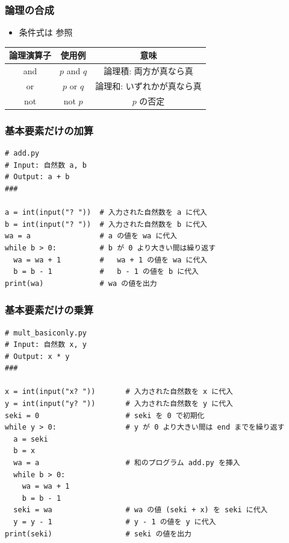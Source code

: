 \begin{frame}[fragile]
\frametitle{論理の合成}
  \begin{itemize}
\item 条件式は \href{https://docs.python.org/ja/3/reference/index.html}{}参照
  \end{itemize}
  \begin{center}
    \begin{tabular}{c|c|c}
論理演算子&使用例&意味\\\hline
and & $p$ and $q$ & 論理積: 両方が真なら真\\
or & $p$ or $q$ & 論理和: いずれかが真なら真\\
not & not $p$ & $p$ の否定\\
    \end{tabular}
  \end{center}
\end{frame}
\begin{frame}
\frametitle{基本要素だけの加算}
  \begin{lstlisting}[caption={add.py},label=add]
# add.py
# Input: 自然数 a, b
# Output: a + b
###

a = int(input("? "))  # 入力された自然数を a に代入
b = int(input("? "))  # 入力された自然数を b に代入
wa = a                # a の値を wa に代入
while b > 0:          # b が 0 より大きい間は繰り返す
  wa = wa + 1         #   wa + 1 の値を wa に代入
  b = b - 1           #   b - 1 の値を b に代入
print(wa)             # wa の値を出力
  \end{lstlisting}
\end{frame}
\begin{frame}[fragile,label=mult,shrink]
\frametitle{基本要素だけの乗算}
  \begin{lstlisting}[caption={mult\_basiconly.py},label=lst:mult]
# mult_basiconly.py
# Input: 自然数 x, y
# Output: x * y
###

x = int(input("x? "))       # 入力された自然数を x に代入
y = int(input("y? "))       # 入力された自然数を y に代入
seki = 0                    # seki を 0 で初期化
while y > 0:                # y が 0 より大きい間は end までを繰り返す
  a = seki
  b = x
  wa = a                    # 和のプログラム add.py を挿入
  while b > 0:
    wa = wa + 1
    b = b - 1
  seki = wa                 # wa の値 (seki + x) を seki に代入
  y = y - 1                 # y - 1 の値を y に代入
print(seki)                 # seki の値を出力
  \end{lstlisting}
\end{frame}
